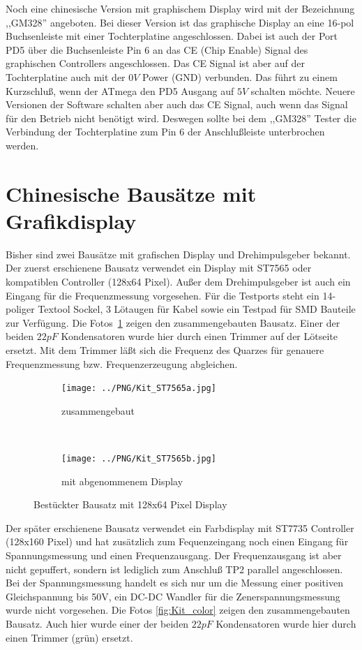 Noch eine chinesische Version mit graphischem Display wird mit der Bezeichnung ,,GM328'' angeboten.
Bei dieser Version ist das graphische Display an eine 16-pol Buchsenleiste mit einer Tochterplatine
angeschlossen.
Dabei ist auch der Port PD5 über die Buchsenleiste Pin 6 an das CE (Chip Enable) Signal
des graphischen Controllers angeschlossen. Das CE Signal ist aber auf der Tochterplatine auch mit der
\(0V\) Power (GND) verbunden.
Das führt zu einem Kurzschluß, wenn der ATmega den PD5 Ausgang auf \(5V\) schalten möchte.
Neuere Versionen der Software schalten aber auch das CE Signal, auch wenn das Signal für den Betrieb nicht
benötigt wird.
Deswegen sollte bei dem ,,GM328'' Tester die Verbindung der Tochterplatine zum Pin 6 
der Anschlußleiste unterbrochen werden.

\section{Chinesische Bausätze mit Grafikdisplay}

Bisher sind zwei Bausätze mit grafischen Display und Drehimpulsgeber bekannt.
Der zuerst erschienene Bausatz verwendet ein Display mit ST7565 oder kompatiblen Controller (128x64 Pixel).
Außer dem Drehimpulsgeber ist  auch ein Eingang für die Frequenzmessung vorgesehen.
Für die Testports steht ein 14-poliger Textool Sockel, 3 Lötaugen für Kabel sowie ein Testpad
für SMD Bauteile zur Verfügung. 
Die Fotos~\ref{fig:Kit_mono} zeigen den zusammengebauten Bausatz.
Einer der beiden \(22 pF\) Kondensatoren 
wurde hier durch einen Trimmer auf der Lötseite ersetzt. Mit dem Trimmer läßt sich die Frequenz des Quarzes für genauere
Frequenzmessung bzw. Frequenzerzeugung abgleichen.

\begin{figure}[H]
  \begin{subfigure}[b]{.5\textwidth}	%
    \centering
    \texttt{[image: ../PNG/Kit\_ST7565a.jpg]}	%
    \caption{zusammengebaut}
  \end{subfigure}
  ~
  \begin{subfigure}[b]{.5\textwidth}	%
    \centering
    \texttt{[image: ../PNG/Kit\_ST7565b.jpg]}	%
    \caption{mit abgenommenem Display}
  \end{subfigure}
  \caption{Bestückter Bausatz mit 128x64 Pixel Display}
  \label{fig:Kit_mono}
\end{figure}

Der später erschienene Bausatz verwendet ein Farbdisplay mit ST7735 Controller (128x160 Pixel) 
und hat zusätzlich zum Fequenzeingang noch einen Eingang für Spannungsmessung und einen Frequenzausgang.
Der Frequenzausgang ist aber nicht gepuffert, sondern ist lediglich zum Anschluß TP2 parallel 
angeschlossen. Bei der Spannungsmessung handelt es sich nur um die Messung einer positiven Gleichspannung bis 50V,
ein DC-DC Wandler für die Zenerspannungsmessung wurde nicht vorgesehen.
Die Fotos \ref{fig:Kit_color} zeigen den zusammengebauten Bausatz.
Auch hier wurde einer der beiden \(22 pF\) Kondensatoren 
wurde hier durch einen Trimmer (grün) ersetzt. 

